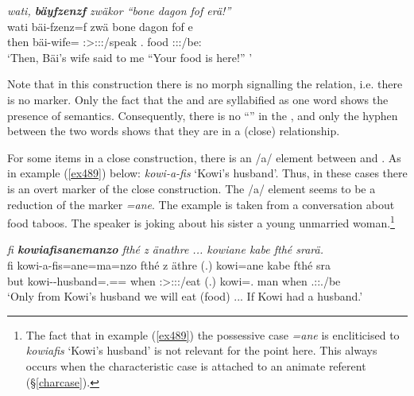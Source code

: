 \begin{exe}
	\ex \textit{wati, \textbf{bäyfzenzf} zwäkor ``bone dagon fof erä!''}\\
	\gll wati bäi-fzenz=f zwä bone dagon fof e\\
	then bäi-wife=\Erg{} \Stsg:\Sbj>\Fsg{}:\Obj:\Rpst:\Pfv/speak \Ssg{}.\Poss{} food \Emph{} \Stpl:\Sbj:\Nonpast:\Ipfv/be:\\ 
	\trans `Then, Bäi's wife said to me ``Your food is here!'' '
	\label{ex450}
\end{exe}

Note that in this construction there is no morph signalling the  relation, i.e. there is no   marker. Only the fact that the  and  are syllabified as one word shows the presence of  semantics. Consequently, there is no ``'' in the , and only the hyphen between the two words shows that they are in a (close)  relationship.%

For some items in a close  construction, there is an /a/ element between  and . As in example (\ref{ex489}) below: \emph{kowi-a-fis} `Kowi's husband'. Thus, in these cases there is an overt marker of the close  construction. The /a/ element seems to be a reduction of the   marker \emph{=ane}. The example is taken from a conversation about food taboos. The speaker is joking about his sister \textendash{} a young unmarried woman.\footnote{The fact that in example (\ref{ex489}) the possessive case \emph{=ane} is encliticised to \emph{kowiafis} `Kowi's husband' is not relevant for the point here. This always occurs when the characteristic case is attached to an animate referent (\S{}\ref{charcase}).}

\begin{exe}
	\ex \emph{fi \textbf{kowiafisanemanzo} fthé z änathre ... kowiane kabe fthé srarä.}\\
	\gll fi kowi-a-fis=ane=ma=nzo fthé z äthre (.) kowi=ane kabe fthé sra\\
	but kowi-\Poss-husband=\Poss.\Sg=\Char=\Only{} when \Iam{} \Fpl:\Sbj>\Stpl:\Obj:\Nonpast:\Ipfv/eat (.) kowi=\Poss.\Sg{} man when \Tsg.\Masc:\Io:\Irr.\Ipfv/be\\
	\trans `Only from Kowi's husband we will eat (food) ... If Kowi had a husband.'\\
	\label{ex489}
\end{exe}

